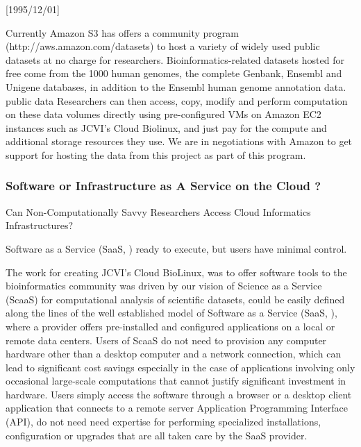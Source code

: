 \NeedsTeXFormat{LaTeX2e}[1995/12/01] \documentclass[10pt]{bmc_article}
\newenvironment{bmcformat}{\begin{raggedright}\baselineskip20pt\sloppy\setboolean{publ}{false}}{\end{raggedright}\baselineskip20pt\sloppy}
\begin{document}
\begin{bmcformat}
Currently Amazon S3 has offers a community program (http://aws.amazon.com/datasets) to host a variety of
widely used public datasets at no charge for  researchers.  Bioinformatics-related datasets hosted for free
come from the 1000 human genomes, the complete Genbank, Ensembl and Unigene databases, in addition to the
Ensembl human genome annotation data. public data Researchers can then access, copy, modify and perform
computation on these data volumes directly using pre-configured VMs on Amazon EC2 instances such as JCVI's
Cloud Biolinux, and just pay for the compute and additional storage resources they use. We are in negotiations
with Amazon to get support for hosting the data from this project as part of this program.


\subsubsection*{Software or Infrastructure as A Service on the Cloud ?}

Can Non-Computationally Savvy Researchers Access Cloud Informatics Infrastructures? 


Software as a Service (SaaS, \cite{papazoglou2003}) ready to execute, but users have minimal control.

The work for creating JCVI's Cloud BioLinux, was to offer software tools to the bioinformatics community was 
driven by our vision of  Science as a Service (ScaaS) for computational analysis of scientific datasets, could be easily 
defined along the lines of the well established model of Software as a Service (SaaS, \cite{papazoglou2003}), 
where a provider offers pre-installed and configured applications on a local or remote data centers. Users of 
ScaaS do not need to provision any computer hardware other than a desktop computer and a network connection, 
which can lead to significant cost savings especially in the case of applications involving only occasional 
large-scale computations that cannot justify significant investment in hardware. Users simply access the 
software through a browser or a desktop client application that connects to a remote server Application 
Programming Interface (API), do not need need expertise for performing specialized installations, configuration 
or upgrades that are all taken care by the SaaS provider.  


\end{bmcformat}
\end{document}
